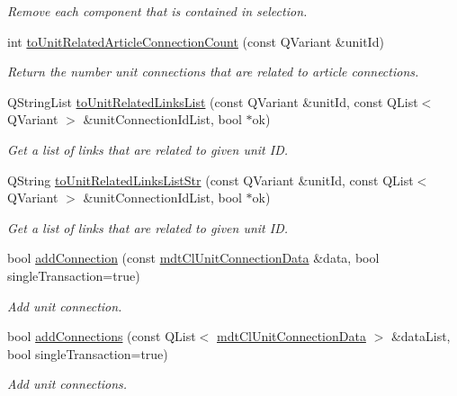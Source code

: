 \begin{DoxyCompactItemize}
\begin{DoxyCompactList}\small\item\em Remove each component that is contained in selection. \end{DoxyCompactList}\item 
int \hyperlink{classmdt_cl_unit_aaa3bba512c75d0358283e25723abf2f9}{to\-Unit\-Related\-Article\-Connection\-Count} (const Q\-Variant \&unit\-Id)
\begin{DoxyCompactList}\small\item\em Return the number unit connections that are related to article connections. \end{DoxyCompactList}\item 
Q\-String\-List \hyperlink{classmdt_cl_unit_a44ffa59c9588ca5afed64e8b1d94262c}{to\-Unit\-Related\-Links\-List} (const Q\-Variant \&unit\-Id, const Q\-List$<$ Q\-Variant $>$ \&unit\-Connection\-Id\-List, bool $\ast$ok)
\begin{DoxyCompactList}\small\item\em Get a list of links that are related to given unit I\-D. \end{DoxyCompactList}\item 
Q\-String \hyperlink{classmdt_cl_unit_af87a65741ba7a6aa9f47a996005a9c3a}{to\-Unit\-Related\-Links\-List\-Str} (const Q\-Variant \&unit\-Id, const Q\-List$<$ Q\-Variant $>$ \&unit\-Connection\-Id\-List, bool $\ast$ok)
\begin{DoxyCompactList}\small\item\em Get a list of links that are related to given unit I\-D. \end{DoxyCompactList}\item 
bool \hyperlink{classmdt_cl_unit_a42b6918f809126d4ca1002c343f90316}{add\-Connection} (const \hyperlink{classmdt_cl_unit_connection_data}{mdt\-Cl\-Unit\-Connection\-Data} \&data, bool single\-Transaction=true)
\begin{DoxyCompactList}\small\item\em Add unit connection. \end{DoxyCompactList}\item 
bool \hyperlink{classmdt_cl_unit_a23c85173bd518a70e8fbae27f3e121ad}{add\-Connections} (const Q\-List$<$ \hyperlink{classmdt_cl_unit_connection_data}{mdt\-Cl\-Unit\-Connection\-Data} $>$ \&data\-List, bool single\-Transaction=true)
\begin{DoxyCompactList}\small\item\em Add unit connections. \end{DoxyCompactList}\item 

\end{DoxyCompactItemize}
